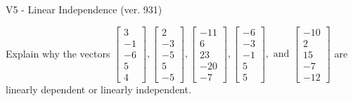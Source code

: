 \begin{exercise}
  \begin{exerciseTitle}V5 - Linear Independence (ver. 931)\end{exerciseTitle}
  \begin{exerciseStatement}
    Explain why the vectors \(\left[\begin{array}{r}
3 \\
-1 \\
-6 \\
5 \\
4
\end{array}\right] , \left[\begin{array}{r}
2 \\
-3 \\
-5 \\
5 \\
-5
\end{array}\right] , \left[\begin{array}{r}
-11 \\
6 \\
23 \\
-20 \\
-7
\end{array}\right] , \left[\begin{array}{r}
-6 \\
-3 \\
-1 \\
5 \\
5
\end{array}\right] , \text{ and } \left[\begin{array}{r}
-10 \\
2 \\
15 \\
-7 \\
-12
\end{array}\right]\) are linearly dependent or linearly independent.	



\end{exerciseStatement}
\end{exercise}
